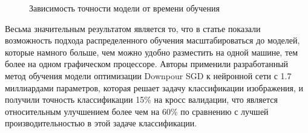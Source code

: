 \begin{figure}[H]%
	\centering
	\caption{Зависимость точности модели от времени обучения}
	\label{framework} %
\end{figure}

Весьма значительным результатом является то, что в статье показали возможность подхода распределенного обучения масштабироваться до моделей, которые намного больше, чем можно удобно разместить на одной машине, тем более на одном графическом процессоре. Авторы применили разработанный метод обучения модели оптимизации Downpour SGD к нейронной сети с 1.7 миллиардами параметров, которая решает задачу классификации изображения, и получили точность классификации 15\% на кросс валидации, что является относительным улучшением более чем на 60\% по сравнению с лучшей производительностью в этой задаче классификации. 
